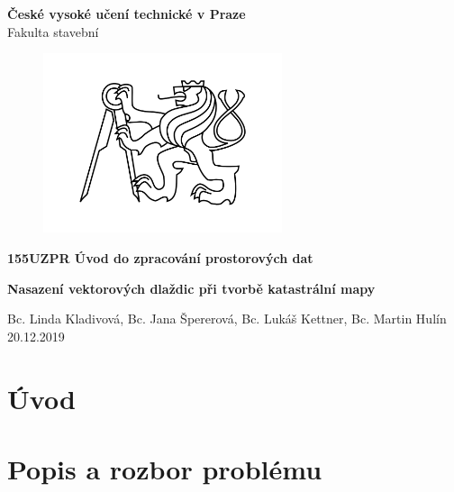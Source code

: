 \documentclass[12pt]{article}
\begin{document}
\begin{titlepage}
\centering
\Large \textbf{České vysoké učení technické v Praze }\\ Fakulta stavební
\vspace{2cm}

\begin{figure}[h!] %
\centering
\includegraphics[width=7cm]{./img/cvut.png}
\end{figure}
 
\Large \textbf{155UZPR Úvod do zpracování prostorových dat}
\vspace{1cm}

\LARGE  \textbf{ Nasazení vektorových dlaždic při tvorbě katastrální mapy}
\vspace{3cm}

\Large Bc. Linda Kladivová, Bc. Jana Špererová, Bc. Lukáš Kettner, Bc. Martin Hulín \\ 20.12.2019

 \thispagestyle{empty} %
\end{titlepage}

\tableofcontents    %
\newpage %
\section{Úvod}



\clearpage 
\section{Popis a rozbor problému}
\end{document}
